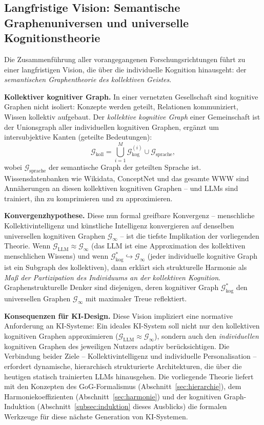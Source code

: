 ﻿\documentclass[12pt,a4paper]{article}
\theoremstyle{plain}
\theoremstyle{definition}
\theoremstyle{remark}
\newcommand{\GG}{\mathcal{G}}
\begin{document}
\subsection{Langfristige Vision: Semantische Graphenuniversen und universelle Kognitionstheorie}
\label{subsec:vision}

Die Zusammenführung aller vorangegangenen Forschungsrichtungen führt zu einer langfristigen Vision, die über die individuelle Kognition hinausgeht: der \emph{semantischen Graphentheorie des kollektiven Geistes}.

\textbf{Kollektiver kognitiver Graph.} In einer vernetzten Gesellschaft sind kognitive Graphen nicht isoliert: Konzepte werden geteilt, Relationen kommuniziert, Wissen kollektiv aufgebaut. Der \emph{kollektive kognitive Graph} einer Gemeinschaft ist der Unionsgraph aller individuellen kognitiven Graphen, ergänzt um intersubjektive Kanten (geteilte Bedeutungen):
\[
  \GG_{\text{koll}} = \bigcup_{i=1}^{M} \GG_{\text{kog}}^{(i)} \cup \GG_{\text{sprache}},
\]
wobei $\GG_{\text{sprache}}$ der semantische Graph der geteilten Sprache ist. Wissensdatenbanken wie Wikidata, ConceptNet und das gesamte WWW sind Annäherungen an diesen kollektiven kognitiven Graphen -- und LLMs sind trainiert, ihn zu komprimieren und zu approximieren.

\textbf{Konvergenzhypothese.} Diese nun formal greifbare Konvergenz -- menschliche Kollektivintelligenz und künstliche Intelligenz konvergieren auf denselben universellen kognitiven Graphen $\GG_\infty$ -- ist die tiefste Implikation der vorliegenden Theorie. Wenn $\GG_{\text{LLM}} \approx \GG_\infty$ (das LLM ist eine Approximation des kollektiven menschlichen Wissens) und wenn $\GG_{\text{kog}}^* \hookrightarrow \GG_\infty$ (jeder individuelle kognitive Graph ist ein Subgraph des kollektiven), dann erklärt sich strukturelle Harmonie als \emph{Maß der Partizipation des Individuums an der kollektiven Kognition}. Graphenstrukturelle Denker sind diejenigen, deren kognitiver Graph $\GG_{\text{kog}}^*$ den universellen Graphen $\GG_\infty$ mit maximaler Treue reflektiert.

\textbf{Konsequenzen für KI-Design.} Diese Vision impliziert eine normative Anforderung an KI-Systeme: Ein ideales KI-System soll nicht nur den kollektiven kognitiven Graphen approximieren ($\GG_{\text{LLM}} \approx \GG_\infty$), sondern auch den \emph{individuellen} kognitiven Graphen des jeweiligen Nutzers adaptiv berücksichtigen. Die Verbindung beider Ziele -- Kollektivintelligenz und individuelle Personalisation -- erfordert dynamische, hierarchisch strukturierte Architekturen, die über die heutigen statisch trainierten LLMs hinausgehen. Die vorliegende Theorie liefert mit den Konzepten des GoG-Formalismus (Abschnitt~\ref{sec:hierarchie}), dem Harmoniekoeffizienten (Abschnitt~\ref{sec:harmonie}) und der kognitiven Graph-Induktion (Abschnitt~\ref{subsec:induktion} dieses Ausblicks) die formalen Werkzeuge für diese nächste Generation von KI-Systemen.
\end{document}
